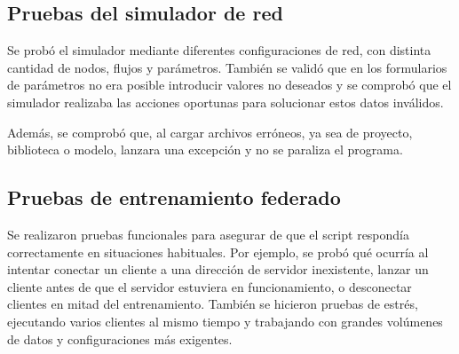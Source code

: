\subsection{Pruebas del simulador de red}
\label{subsec:PruebasSimulador}
Se probó el simulador mediante diferentes configuraciones de red, con distinta cantidad de nodos, flujos y parámetros. También se validó que en los formularios de parámetros no era posible introducir valores no deseados y se comprobó que el simulador realizaba las acciones oportunas para solucionar estos datos inválidos.

Además, se comprobó que, al cargar archivos erróneos, ya sea de proyecto, biblioteca o modelo, lanzara una excepción y no se paraliza el programa.

\subsection{Pruebas de entrenamiento federado}
\label{subsec:PruebasEntrenamientoFederado}
Se realizaron pruebas funcionales para asegurar de que el script respondía correctamente en situaciones habituales. Por ejemplo, se probó qué ocurría al intentar conectar un cliente a una dirección de servidor inexistente, lanzar un cliente antes de que el servidor estuviera en funcionamiento, o desconectar clientes en mitad del entrenamiento. También se hicieron pruebas de estrés, ejecutando varios clientes al mismo tiempo y trabajando con grandes volúmenes de datos y configuraciones más exigentes.
